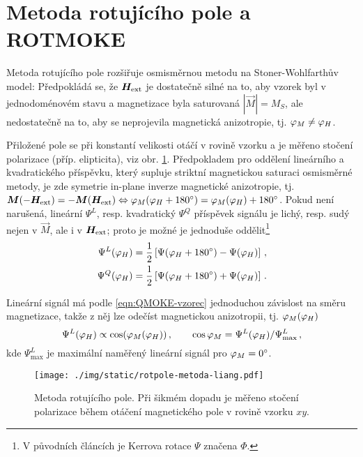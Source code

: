 \section{Metoda rotujícího pole a ROTMOKE}
\label{chap:ROTMOKE}

Metoda rotujícího pole\cite{liangSeparationLinearQuadratic2015,liangQuantitativeStudyQuadratic2015} rozšiřuje osmisměrnou metodu na Stoner-Wohlfarthův model: Předpokládá se, že $\bm{H}_\textrm{ext}$ je dostatečně silné na to, aby vzorek byl v jednodoménovém stavu a magnetizace byla saturovaná $|\vec{M}|=M_S$, ale nedostatečně na to, aby se neprojevila magnetická anizotropie, tj. $\varphi_M\neq\varphi_H$.

Přiložené pole se při konstantí velikosti otáčí v rovině vzorku a je měřeno stočení polarizace (příp. elipticita), viz obr. \ref{fig:metoda-rotujiciho-pole}.
Předpokladem pro oddělení lineárního a kvadratického příspěvku, který supluje striktní magnetickou saturaci osmisměrné metody,
je zde symetrie in-plane inverze magnetické anizotropie, tj. $\bm{M}(-\bm{H}_\textrm{ext})=-\bm{M}(\bm{H}_\textrm{ext}) \Leftrightarrow \varphi_M(\varphi_H+\SI{180}{\degree})=\varphi_M(\varphi_H)+\SI{180}{\degree}$.
Pokud není narušená, lineární $\Psi^L$, resp. kvadratický $\Psi^Q$ příspěvek signálu je lichý, resp. sudý nejen v $\vec{M}$, ale i v $\bm{H}_\textrm{ext}$;
proto je možné je jednoduše oddělit\footnote{V původních článcích je Kerrova rotace $\Psi$ značena $\Phi$.}
\begin{align}
    \label{eqn:rotmoke-separace}
    \Psi^L(\varphi_H)&=\frac{1}{2} \left[ \Psi(\varphi_H+\SI{180}{\degree}) - \Psi(\varphi_H) \right] 
    \,, \\ \Psi^Q(\varphi_H)&=\frac{1}{2} \left[ \Psi(\varphi_H+\SI{180}{\degree}) + \Psi(\varphi_H) \right] \,.
\end{align}

Lineární signál má podle \eqref{eqn:QMOKE-vzorec} jednoduchou závislost na směru magnetizace, takže z něj lze odečíst magnetickou anizotropii, tj. $\varphi_M(\varphi_H)$
\begin{equation}
    \label{eqn:rotmoke-anizotropie}
    \Psi^L(\varphi_H)\propto \cos(\varphi_M(\varphi_H)) \,, \qquad \cos \varphi_M=\Psi^L(\varphi_H)/\Psi^L_\textrm{max} \,,
\end{equation}
kde $\Psi^L_\textrm{max}$ je maximální naměřený lineární signál pro $\varphi_M=\SI{0}{\degree}$.

\begin{figure}[htbp]
    \centering
    \texttt{[image: ./img/static/rotpole-metoda-liang.pdf]}
    \caption{Metoda rotujícího pole.
    Při šikmém dopadu je měřeno stočení polarizace během otáčení magnetického pole v rovině vzorku $xy$. \cite{liangQuantitativeStudyQuadratic2015}}
    \label{fig:metoda-rotujiciho-pole}
\end{figure}

